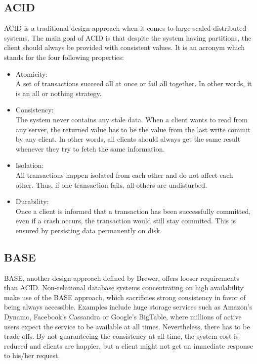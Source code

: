 \subsection{ACID}
\label{sec:background_acid}
ACID is a traditional design approach when it comes to large-scaled distributed systems. The main goal of ACID is that despite the system having partitions, the client should always be provided with consistent values. It is an acronym which stands for the four following properties:
\begin{itemize}
\item Atomicity:\\
A set of transactions succeed all at once or fail all together. In other words, it is an all or nothing strategy.
\item Consistency: \\
The system never contains any stale data. When a client wants to read from any server, the returned value has to be the value from the last write commit by any client. In other words, all clients should always get the same result whenever they try to fetch the same information.
\item Isolation:\\
All transactions happen isolated from each other and do not affect each other. Thus, if one transaction fails, all others are undisturbed.
\item Durability:\\
Once a client is informed that a transaction has been successfully committed, even if a crash occurs, the transaction would still stay commited. This is ensured by persisting data permanently on disk.
\end{itemize} 

\subsection{BASE}
\label{sec:background_base}
BASE, another design approach defined by Brewer, offers looser requirements than ACID. Non-relational database systems concentrating on high availability make use of the BASE approach, which sacrificies strong consistency in favor of being always accessible. Examples include huge storage services such as Amazon's Dynamo, Facebook's Cassandra or Google's BigTable, where millions of active users expect the service to be available at all times. Nevertheless, there has to be trade-offs. By not guaranteeing the consistency at all time, the system cost is reduced and clients are happier, but a client might not get an immediate response to his/her request.

